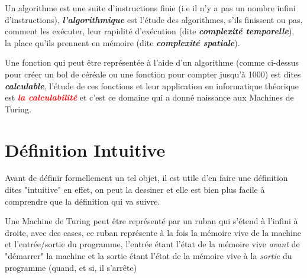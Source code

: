 \documentclass[colorlinks]{article}
\begin{document}
    Un algorithme est une suite d'instructions finie (i.e il n'y a pas un nombre infini d'instructions), 
    \textbf{\textit{l'algorithmique}} est l'étude des algorithmes, s'ils finissent ou pas, comment les exécuter, leur rapidité 
    d'exécution (dite \textbf{\textit{complexité temporelle}}), la place qu'ils prennent en mémoire (dite \textbf{\textit{complexité spatiale}}).\newline


    Une fonction qui peut être représentée à l'aide d'un algorithme (comme ci-dessus pour créer un bol de céréale ou une fonction pour 
    compter jusqu'à 1000) est dites \textbf{\textit{calculable}}, l'étude de ces fonctions et leur application en informatique théorique est 
    \textcolor{red}{\textbf{\textit{la calculabilité}}} et c'est ce domaine qui a donné naissance aux Machines de Turing.
    
    \cleardoublepage
    \section{Définition Intuitive}
    Avant de définir formellement un tel objet, il est utile d'en faire une définition dites "intuitive" en effet, on peut la dessiner
    et elle est bien plus facile à comprendre que la définition qui va suivre.\newline

    Une Machine de Turing peut être représenté par un ruban qui s'étend à l'infini à droite, avec des cases, ce ruban représente à 
    la fois la mémoire vive de la machine et l'entrée/sortie du programme, l'entrée étant l'état de la mémoire vive \textit{avant} 
    de "démarrer" la machine et la sortie étant l'état de la mémoire vive à la \textit{sortie} du programme (quand, et si, il s'arrête)
\end{document}
